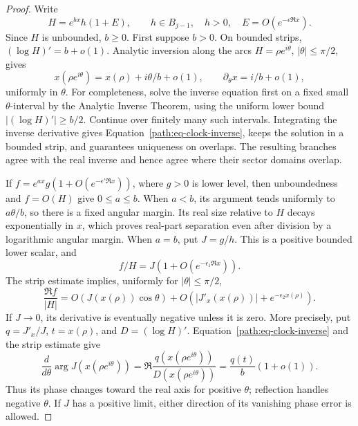 \begin{proof}
Write
\begin{equation}\label{path:eq-H-leading}
 H=e^{bx}h(1+E),\qquad h\in B_{j-1},\quad h>0,
 \quad E=O(e^{-\epsilon\Re x}).
\end{equation}
Since \(H\) is unbounded, \(b\ge0\).  First suppose \(b>0\).
On bounded strips,
\((\log H)'=b+o(1)\).  Analytic inversion along the arcs
\(H=\rho e^{i\theta}\), \(|\theta|\le\pi/2\), gives
\begin{equation}\label{path:eq-clock-inverse}
 x(\rho e^{i\theta})=x(\rho)+i\theta/b+o(1),\qquad
 \partial_\theta x=i/b+o(1),
\end{equation}
uniformly in \(\theta\).  For completeness, solve the inverse equation
first on a fixed small \(\theta\)-interval by the Analytic Inverse
Theorem, using the uniform lower bound \(|(\log H)'|\ge b/2\).
Continue over finitely many such intervals.  Integrating the inverse
derivative gives Equation~\eqref{path:eq-clock-inverse}, keeps the
solution in a bounded strip, and guarantees uniqueness on overlaps.
The resulting branches agree with the real inverse and hence agree
where their sector domains overlap.

If \(f=e^{ax}g(1+O(e^{-\epsilon'\Re x}))\), where \(g>0\) is lower
level, then unboundedness and \(f=O(H)\) give \(0\le a\le b\).
When \(a<b\), its argument tends uniformly to \(a\theta/b\), so
there is a fixed angular margin.  Its real size relative to \(H\)
decays exponentially in \(x\), which proves real-part separation even
after division by a logarithmic angular margin.  When \(a=b\), put
\(J=g/h\).  This is a positive bounded lower scalar, and
\[
 f/H=J(1+O(e^{-\epsilon_1\Re x})).
\]
The strip estimate implies, uniformly for \(|\theta|\le\pi/2\),
\[
 \frac{\Re f}{|H|}
   =O(J(x(\rho))\cos\theta)
     +O(|J'_x(x(\rho))|+e^{-\epsilon_2x(\rho)}).
\]
If \(J\to0\), its derivative is eventually negative unless it is
zero.  More precisely, put \(q=J'_x/J\), \(t=x(\rho)\), and
\(D=(\log H)'\).  Equation~\eqref{path:eq-clock-inverse} and the
strip estimate give
\[
 \frac{d}{d\theta}\arg J(x(\rho e^{i\theta}))
   =\Re\frac{q(x(\rho e^{i\theta}))}{D(x(\rho e^{i\theta}))}
   =\frac{q(t)}b(1+o(1)).
\]
Thus its phase changes toward the real axis for positive \(\theta\);
reflection handles negative \(\theta\).
If \(J\) has a positive limit, either direction of its vanishing
phase error is allowed.


\end{proof}
